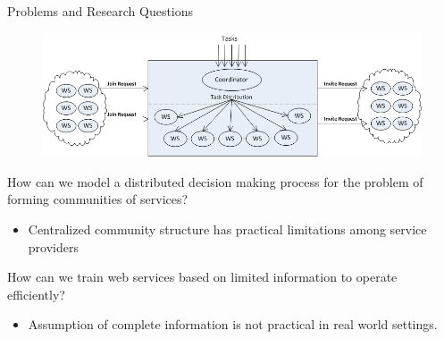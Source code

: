 \documentclass{beamer}
\begin{document}
\begin{frame}{Problems and Research Questions}
    \begin{figure}[htbp]
        \centering
        \includegraphics[width=1.0 \columnwidth]{figures/rq2.png}
    \end{figure}
    
    \footnotesize{\colorbox{blue}{\color{white}{R4}} How can we model a distributed decision making process for the problem of forming communities of services?}\\
        \begin{itemize}
            \item Centralized community structure has practical limitations among service providers            
        \end{itemize}
    \vspace{0.3cm} \colorbox{blue}{\color{white}{R5}} How can we train web services based on limited information to operate efficiently?\\
        \begin{itemize}
            \item Assumption of complete information is not practical in real world settings.
        \end{itemize}
\end{frame}
\end{document}
